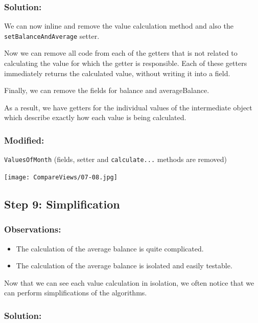 \documentclass[a4paper,fleqn,titlepage,11pt]{article}
\begin{document}
\subsubsection*{Solution:}

We can now inline and remove the value calculation method and also the \texttt{setBalanceAndAverage} setter.

Now we can remove all code from each of the getters that is not related to calculating the value for which the getter is responsible. Each of these getters immediately returns the calculated value, without writing it into a field.

Finally, we can remove the fields for balance and averageBalance.

As a result, we have getters for the individual values of the intermediate object which describe exactly how each value is being calculated.

\subsubsection*{Modified:}

\texttt{ValuesOfMonth} (fields, setter and \texttt{calculate...} methods are removed)

\texttt{[image: CompareViews/07-08.jpg]}



\subsection*{Step 9: Simplification}

\subsubsection*{Observations:}
\begin{itemize}
\item The calculation of the average balance is quite complicated.
\item The calculation of the average balance is isolated and easily testable.
\end{itemize}

Now that we can see each value calculation in isolation, we often notice that we can perform simplifications of the algorithms. 

\subsubsection*{Solution:}
\end{document}
